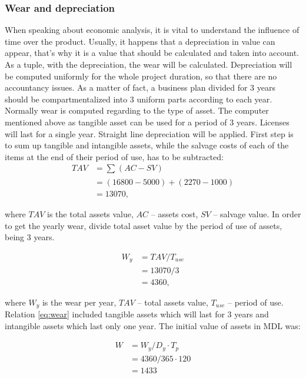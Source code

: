 \subsubsection{Wear and depreciation}
When speaking about economic analysis, it is vital to understand the influence of time over the product. Usually, it happens that a depreciation in value can appear, that's why it is a value that should be calculated and taken into account. As a tuple, with the depreciation, the wear will be calculated. Depreciation will be computed uniformly for the whole project duration, so that there are no accountancy issues. As a matter of fact, a business plan divided for 3 years should be compartmentalized into 3 uniform parts according to each year.
Normally wear is computed regarding to the type of asset. The computer mentioned above as tangible asset  can be used for a period of 3 years. Licenses will last for a single year. Straight line depreciation will be applied. First step is to sum up tangible and intangible assets, while the salvage costs of each of the items at the end of their period of use, has to be subtracted:
\begin{equation}
\begin{split}
TAV &= \sum_{} (AC - SV) \\
&= (16800 - 5000) + (2270 - 1000) \\
&= 13070,
\end{split}
\end{equation}

\noindent
where $TAV$ is the total assets value, $AC$ -- assets cost, $SV$ -- salvage value.
In order to get the yearly wear, divide total asset value by the period of use of assets, being 3 years.

\begin{equation} \label{eq:wear}
\begin{split}
W_y &= TAV / T_{use} \\
&= 13070/3\\
&= 4360,
\end{split}
\end{equation}

\noindent
where $W_y$ is the wear per year, $TAV$ -- total assets value, $T_{use}$ -- period of use. Relation \eqref{eq:wear} included tangible assets which will last for 3 years and intangible assets which last only one year. The initial value of assets in MDL was:

\begin{equation}
\begin{split}
W &= W_y / D_y \cdot T_p\\
&= 4360  / 365  \cdot 120 \\
&= 1433
\end{split}
\end{equation}
